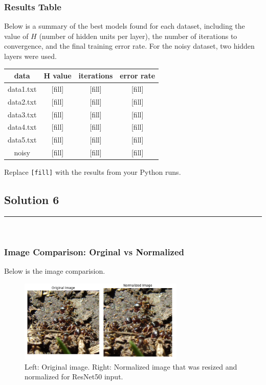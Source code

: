 \documentclass{article}
\begin{document}
\subsubsection*{Results Table}
\parbox{\textwidth}{
Below is a summary of the best models found for each dataset, including the value of $H$ (number of hidden units per layer), the number of iterations to convergence, and the final training error rate. For the noisy dataset, two hidden layers were used.

\begin{center}
\begin{tabular}{|c|c|c|c|}
\hline
\textbf{data} & \textbf{H value} & \textbf{iterations} & \textbf{error rate} \\
\hline
data1.txt & [fill] & [fill] & [fill] \\
data2.txt & [fill] & [fill] & [fill] \\
data3.txt & [fill] & [fill] & [fill] \\
data4.txt & [fill] & [fill] & [fill] \\
data5.txt & [fill] & [fill] & [fill] \\
noisy     & [fill] & [fill] & [fill] \\
\hline
\end{tabular}
\end{center}

Replace \texttt{[fill]} with the results from your Python runs.
}

\newpage

\subsection*{Solution 6}
\noindent\rule{\textwidth}{0.4pt}\\

\subsubsection*{Image Comparison: Orginal vs Normalized}
\parbox{\textwidth}{
  
Below is the image comparision.
\begin{figure}[H]
    \centering
    \includegraphics[width=0.7\textwidth]{q6_image_comparison.png}
    \caption{Left: Original image. Right: Normalized image that was resized and normalized for ResNet50 input.}
\end{figure}

}
\end{document}
